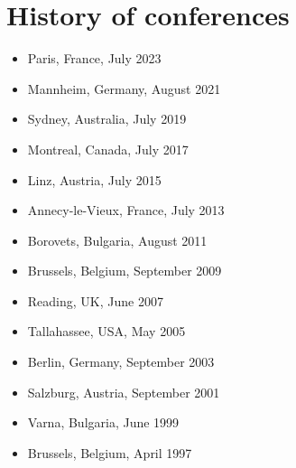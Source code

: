 \documentclass{article}
\begin{document}
\section{History of conferences}
\begin{itemize}
\item Paris, France, July 2023
\item  Mannheim, Germany, August 2021
\item Sydney, Australia, July 2019
\item Montreal, Canada, July 2017
\item  Linz, Austria, July 2015
\item  Annecy-le-Vieux, France, July 2013
\item  Borovets, Bulgaria, August 2011
\item  Brussels, Belgium, September 2009
\item  Reading, UK, June 2007
\item  Tallahassee, USA, May 2005
\item  Berlin, Germany, September 2003
\item  Salzburg, Austria, September 2001
\item  Varna, Bulgaria, June 1999
\item  Brussels, Belgium, April 1997
\end{itemize}
\end{document}
